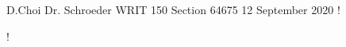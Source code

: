 \documentclass[12pt, letterpaper]{article}
\begin{document}
\begin{mla}
	{D.}{Choi}
	{Dr. Schroeder}
	{WRIT 150 Section 64675}
	{12 September 2020}
	{!}

!

\end{mla}
\end{document}
